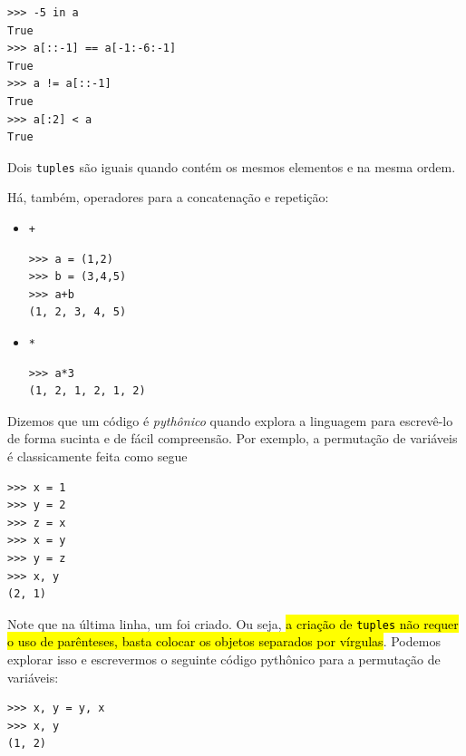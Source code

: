 \begin{lstlisting}
>>> -5 in a
True
>>> a[::-1] == a[-1:-6:-1]
True
>>> a != a[::-1]
True
>>> a[:2] < a
True
\end{lstlisting}

\ifisbook
\vspace{0.2cm}
\fi

\begin{obs}
  Dois \texttt{tuples} são iguais quando contém os mesmos elementos e na mesma ordem.
\end{obs}

\ifisbook
\vspace{0.2cm}
\fi

Há, também, operadores para a concatenação e repetição:
\begin{itemize}
\item \lstinline!+! 

\begin{lstlisting}[xrightmargin=2.5em]
>>> a = (1,2)
>>> b = (3,4,5)
>>> a+b
(1, 2, 3, 4, 5)
\end{lstlisting}

\item \lstinline!*! 

\begin{lstlisting}[xrightmargin=2.5em]
>>> a*3
(1, 2, 1, 2, 1, 2)
\end{lstlisting}
\end{itemize}

\begin{obs}
  Dizemos que um código é \emph{pythônico} quando explora a linguagem para escrevê-lo de forma sucinta e de fácil compreensão. Por exemplo, a permutação de variáveis é classicamente feita como segue

\begin{lstlisting}
>>> x = 1
>>> y = 2
>>> z = x
>>> x = y
>>> y = z
>>> x, y
(2, 1)
\end{lstlisting}

Note que na última linha, um {\PYTHONtuple} foi criado. Ou seja, \hl{a criação de \texttt{tuples} não requer o uso de parênteses, basta colocar os objetos separados por vírgulas}. Podemos explorar isso e escrevermos o seguinte código pythônico para a permutação de variáveis:

\begin{lstlisting}
>>> x, y = y, x
>>> x, y
(1, 2)
\end{lstlisting}

\end{obs}

